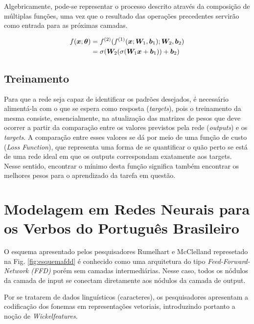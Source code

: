Algebricamente, pode-se representar o processo descrito através da composição de múltiplas funções, uma vez que o resultado das operações precedentes servirão como entrada para as próximas camadas.

\begin{align}
f(\bm{x}; \bm{\theta}) &= f^{(2)}(f^{(1)}(\bm{x}; \bm{W}_1, \bm{b}_1); \bm{W}_2, \bm{b}_2)\\
&= \sigma(\bm{W}_2 (\sigma(\bm{W}_1\bm{x} + \bm{b}_1)) + \bm{b}_2)
\end{align}

\subsection{Treinamento}

Para que a rede seja capaz de identificar os padrões desejados, é necessário alimentá-la com o que se espera como resposta (\textit{targets}), pois o treinamento da mesma consiste, essencialmente, na atualização das matrizes de pesos que deve ocorrer a partir da comparação entre os valores previstos pela rede (\textit{outputs}) e os \textit{targets}. A comparação entre esses valores se dá por meio de uma função de custo (\textit{Loss Function}), que representa uma forma de se quantificar o quão perto se está de uma rede ideal em que os outputs correspondam exatamente aos targets. Nesse sentido, encontrar o mínimo desta função significa também encontrar os melhores pesos para o aprendizado da tarefa em questão.

\section{Modelagem em Redes Neurais para os Verbos do Português Brasileiro}

O esquema apresentado pelos pesquisadores Rumelhart e McClelland represetado na Fig. \ref{fig:esquemafdd} é conhecido como uma arquitetura do tipo \textit{Feed-Forward-Network (FFD)} porém sem camadas intermediárias. Nesse caso, todos os nódulos da camada de input se conectam diretamente aos nódulos da camada de output.

Por se tratarem de dados linguísticos (caracteres), os pesquisadores apresentam a codificação dos fonemas em representações vetoriais, introduzindo portanto a noção de \textit{Wickelfeatures}.

